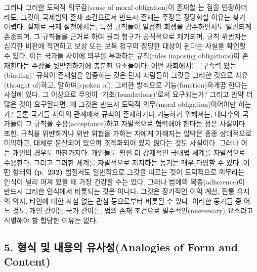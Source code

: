 그러나 그러한 도덕적 의무감(sense of moral obligation)이 존재할
는 점을 인정하더라도, 그것이 국제법의 존재
조건으로서 반드시 존재는 주장을 정당화할 이유는
찾기 어렵다. 실제로 국제 실천에서는, 특정 규칙들이 일정한 희생을
감수하면서도 일관되게 존중되며, 그 규칙들을 근거로 하여 권리 청구가
공식적으로 제기되며, 규칙 위반자는 심각한 비판에 직면하고 보상 또는 보복
청구의 정당한 대상이 된다는 사실을 확인할 수 있다. 이는 국가들 사이에
의무를 부과하는 규칙(rules imposing obligations)이 존재한다는 주장을
뒷받침하기에 충분한 요소들이다. 어떤 사회에서든 `구속력 있는(binding)'
규칙이 존재함을 입증하는 것은 단지 사람들이 그것을 그러한 것으로
사유(thought of)하고, 말하며(spoken of), 그러한 방식으로
기능(function)하게끔 한다는 사실에 있다. 그 이상으로 무엇이
`기초(foundations)'로서 요구되는가? 그리고 만약 더 많은 것이 요구된다면,
왜 그것은 반드시 도덕적 의무(moral obligation)이어야만 하는가? 물론
국가들 사이의 관계에서 규칙이 존재하거나 기능하기 위해서는, 대다수의
국가들이 그 규칙을 수용(acceptance)하고 자발적으로 협력해야 한다는 점은
사실이다. 또한, 규칙을 위반하거나 위반 위협을 가하는 자에게 가해지는
압박은 종종 상대적으로 미약하고, 대체로 분산되어 있으며 조직화되어 있지
않다는 것도 사실이다. 그러나 이는 개인의 경우도 마찬가지다. 개인들도
훨씬 더 강제적인 국내법 체계를 자발적으로 수용한다. 그리고 그러한 체계를
자발적으로 지지하는 동기는 매우 다양할 수 있다. 어떤 형태의
\textbf{(p.~232)} 법질서도 일반적으로 그것을 따르는 것이 도덕적으로
의무라는 인식이 널리 퍼져 있을 때 가장 건강할 수는 있다. 그러나 법에의
복종(adherence)이 반드시 그러한 인식에서 비롯되는 것은 아니다. 그것은
장기적인 이익 계산, 전통 유지의 의지, 타인에 대한 사심 없는 관심
등으로부터 비롯될 수 있다. 이러한 동기들 중 어느 것도, 개인 간이든 국가
간이든, 법의 존재 조건으로 필수적인(nnecessary) 요소라고 식별해야 할
합당한 이유는 없다.

\subsection{5. 형식 및 내용의 유사성(Analogies of Form and
Content)}\label{uxd615uxc2dd-uxbc0f-uxb0b4uxc6a9uxc758-uxc720uxc0acuxc131analogies-of-form-and-content}

